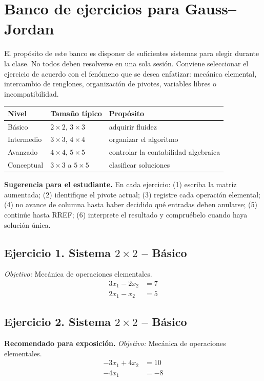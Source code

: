 \documentclass[12pt]{article}
\theoremstyle{remark}
\begin{document}
\section{Banco de ejercicios para Gauss--Jordan}

El propósito de este banco es disponer de suficientes sistemas para elegir durante la clase. No todos
deben resolverse en una sola sesión. Conviene seleccionar el ejercicio de acuerdo con el fenómeno que
se desea enfatizar: mecánica elemental, intercambio de renglones, organización de pivotes, variables
libres o incompatibilidad.

\begin{center}
\begin{tabular}{lll}
\toprule
Nivel & Tamaño típico & Propósito\\
\midrule
Básico & $2\times2$, $3\times3$ & adquirir fluidez\\
Intermedio & $3\times3$, $4\times4$ & organizar el algoritmo\\
Avanzado & $4\times4$, $5\times5$ & controlar la contabilidad algebraica\\
Conceptual & $3\times3$ a $5\times5$ & clasificar soluciones\\
\bottomrule
\end{tabular}
\end{center}

\textbf{Sugerencia para el estudiante.} En cada ejercicio: (1) escriba la matriz aumentada; (2) identifique
el pivote actual; (3) registre cada operación elemental; (4) no avance de columna hasta haber decidido
qué entradas deben anularse; (5) continúe hasta RREF; (6) interprete el resultado y compruébelo cuando
haya solución única.

\subsection*{Ejercicio 1. Sistema $2\times2$ -- Básico}
\emph{Objetivo:} Mecánica de operaciones elementales.
\[
\begin{aligned}
3 x_{1} - 2 x_{2} &= 7\\
2 x_{1} - x_{2} &= 5
\end{aligned}
\]
\subsection*{Ejercicio 2. Sistema $2\times2$ -- Básico}
\textbf{Recomendado para exposición.} \emph{Objetivo:} Mecánica de operaciones elementales.
\[
\begin{aligned}
- 3 x_{1} + 4 x_{2} &= 10\\
- 4 x_{1} &= -8
\end{aligned}
\]
\end{document}
